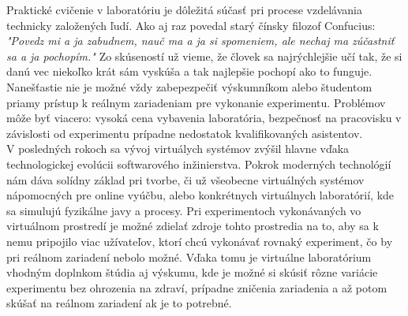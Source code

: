 \indent Praktické cvičenie v laboratóriu je dôležitá súčasť pri procese vzdelávania technicky založených ľudí. Ako aj raz povedal starý čínsky filozof Confucius: \textit{"Povedz mi a ja zabudnem, nauč ma a ja si spomeniem, ale nechaj ma zúčastniť sa a ja pochopím."} Zo skúseností už vieme, že človek sa najrýchlejšie učí tak, že si danú vec niekoľko krát sám vyskúša a tak najlepšie pochopí ako to funguje. Nanešťastie nie je možné vždy zabepezpečiť výskumníkom alebo študentom priamy prístup k reálnym zariadeniam pre vykonanie experimentu. Problémov môže byť viacero: vysoká cena vybavenia laboratória, bezpečnosť na pracovisku v závislosti od experimentu prípadne nedostatok kvalifikovaných asistentov.\\
\indent V posledných rokoch sa vývoj virtuálych systémov zvýšil hlavne vďaka technologickej evolúcii softwarového inžinierstva. Pokrok moderných technológií nám dáva solídny základ pri tvorbe, či už všeobecne virtuálných systémov nápomocných pre online vyúčbu, alebo konkrétnych virtuálnych laboratórií, kde sa simulujú fyzikálne javy a procesy. Pri experimentoch vykonávaných vo virtuálnom prostredí je možné zdielať zdroje tohto prostredia na to, aby sa k nemu pripojilo viac užívateľov, ktorí chcú vykonávať rovnaký experiment, čo by pri reálnom zariadení nebolo možné. Vďaka tomu je virtuálne laboratórium vhodným doplnkom štúdia aj výskumu, kde je možné si skúsiť rôzne variácie experimentu bez ohrozenia na zdraví, prípadne zničenia zariadenia a až potom skúšať na reálnom zariadení ak je to potrebné.\\